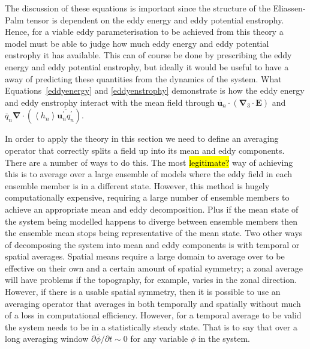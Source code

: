 \documentclass[12pt,a4paper]{report}
\newcommand*\mean[1]{\overline{#1}}
\newcommand*\thkmean[1]{\overline{#1}}
\newcommand*\thkres[1]{{#1}^{\prime}}
\newcommand*\nthkmean[1]{\left\langle{#1}\right\rangle}
\begin{document}
              The discussion of these equations is important since
              the structure of the Eliassen-Palm tensor is 
              dependent on the eddy energy and eddy potential enstrophy. 
              Hence, for a viable eddy parameterisation to be achieved
              from this theory a model must be able to 
              judge how much eddy energy and eddy potential enstrophy it has
              available. This can of course be done by prescribing the
               eddy energy and eddy potential enstrophy, but ideally 
               it would be useful to have a away of predicting these
               quantities from the dynamics of the system. What Equations~\eqref{eddyenergy}
               and \eqref{eddyenstrophy} demonstrate is how the eddy energy 
               and eddy enstrophy interact with the mean field through
               $\thkmean{\boldsymbol{u}}_{n} \cdot \left(\boldsymbol{\nabla}_{3}\cdot \boldsymbol{E}\right)$ and $\thkmean{q}_{n} \boldsymbol{\nabla}\cdot\left( \nthkmean{h_{n}} \thkmean{\thkres{\boldsymbol{u}}_{n}\thkres{q}_{n}} \right)$.
              
              
              In order to apply the theory in this section we need to define an
              averaging operator that correctly splits a field up into its mean
              and eddy components. There are a number of ways to do this. 
              The most \hl{legitimate?} way of achieving this is
              to average over a large ensemble of models where the eddy field in each
              ensemble member is in a different state. However, this method is 
              hugely computationally expensive, requiring a large number of 
              ensemble members to achieve an appropriate mean and eddy
              decomposition. Plus if the mean state of the system being modelled happens 
              to diverge between ensemble members then the ensemble mean stops being 
              representative of the mean state. Two other ways of decomposing
              the system into mean and eddy components is with temporal or spatial
              averages. Spatial means require a large domain to average over to be effective
              on their own and a certain amount of spatial symmetry; a 
              zonal average will have problems if the topography, for example,
              varies in the zonal direction. However, if there is
              a usable spatial symmetry, then it is possible to use
              an averaging operator that averages in both temporally and spatially
              without much of a loss in computational efficiency. However,
              for a temporal average to be valid the system needs to be in
              a statistically steady state. That is to say that over a long
              averaging window $\partial \mean{\phi} /\partial t \sim 0$ for any variable $\phi$
            in the system.
            
\end{document}
